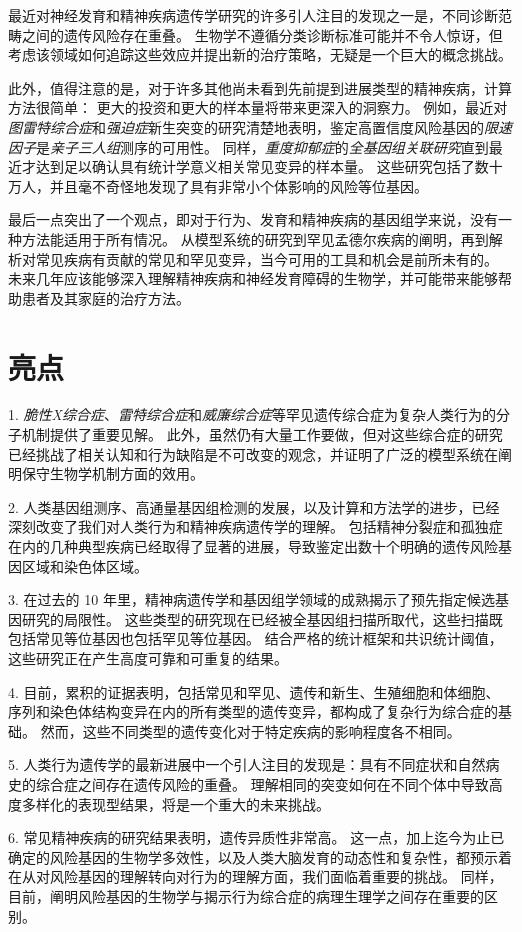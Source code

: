 最近对神经发育和精神疾病遗传学研究的许多引人注目的发现之一是，不同诊断范畴之间的遗传风险存在重叠。
生物学不遵循分类诊断标准可能并不令人惊讶，但考虑该领域如何追踪这些效应并提出新的治疗策略，无疑是一个巨大的概念挑战。


此外，值得注意的是，对于许多其他尚未看到先前提到进展类型的精神疾病，计算方法很简单：
更大的投资和更大的样本量将带来更深入的洞察力。 
例如，最近对\textit{图雷特综合症}和\textit{强迫症}新生突变的研究清楚地表明，鉴定高置信度风险基因的\textit{限速因子}是\textit{亲子三人组}测序的可用性。
同样，\textit{重度抑郁症}的\textit{全基因组关联研究}直到最近才达到足以确认具有统计学意义相关常见变异的样本量。 
这些研究包括了数十万人，并且毫不奇怪地发现了具有非常小个体影响的风险等位基因。


最后一点突出了一个观点，即对于行为、发育和精神疾病的基因组学来说，没有一种方法能适用于所有情况。
从模型系统的研究到罕见孟德尔疾病的阐明，再到解析对常见疾病有贡献的常见和罕见变异，当今可用的工具和机会是前所未有的。
未来几年应该能够深入理解精神疾病和神经发育障碍的生物学，并可能带来能够帮助患者及其家庭的治疗方法。


\section{亮点}

1. \textit{脆性X综合症}、\textit{雷特综合症}和\textit{威廉综合症}等罕见遗传综合症为复杂人类行为的分子机制提供了重要见解。 
此外，虽然仍有大量工作要做，但对这些综合症的研究已经挑战了相关认知和行为缺陷是不可改变的观念，并证明了广泛的模型系统在阐明保守生物学机制方面的效用。


2. 人类基因组测序、高通量基因组检测的发展，以及计算和方法学的进步，已经深刻改变了我们对人类行为和精神疾病遗传学的理解。
包括精神分裂症和孤独症在内的几种典型疾病已经取得了显著的进展，导致鉴定出数十个明确的遗传风险基因区域和染色体区域。



3. 在过去的 10 年里，精神病遗传学和基因组学领域的成熟揭示了预先指定候选基因研究的局限性。
这些类型的研究现在已经被全基因组扫描所取代，这些扫描既包括常见等位基因也包括罕见等位基因。
结合严格的统计框架和共识统计阈值，这些研究正在产生高度可靠和可重复的结果。


4. 目前，累积的证据表明，包括常见和罕见、遗传和新生、生殖细胞和体细胞、序列和染色体结构变异在内的所有类型的遗传变异，都构成了复杂行为综合症的基础。
然而，这些不同类型的遗传变化对于特定疾病的影响程度各不相同。

5. 
人类行为遗传学的最新进展中一个引人注目的发现是：具有不同症状和自然病史的综合症之间存在遗传风险的重叠。
理解相同的突变如何在不同个体中导致高度多样化的表现型结果，将是一个重大的未来挑战。


6. 常见精神疾病的研究结果表明，遗传异质性非常高。
这一点，加上迄今为止已确定的风险基因的生物学多效性，以及人类大脑发育的动态性和复杂性，都预示着在从对风险基因的理解转向对行为的理解方面，我们面临着重要的挑战。
同样，目前，阐明风险基因的生物学与揭示行为综合症的病理生理学之间存在重要的区别。






